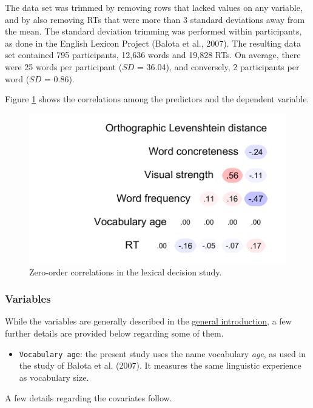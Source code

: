 \documentclass[
  12pt,
  man,floatsintext]{apa7}
\providecommand{\tightlist}{%
  \setlength{\itemsep}{0pt}\setlength{\parskip}{0pt}}
\begin{document}
The data set was trimmed by removing rows that lacked values on any variable, and by also removing RTs that were more than 3 standard deviations away from the mean. The standard deviation trimming was performed within participants, as done in the English Lexicon Project (Balota et al., 2007). The resulting data set contained 795 participants, 12,636 words and 19,828 RTs. On average, there were 25 words per participant (\(SD\) = 36.04), and conversely, 2 participants per word (\(SD\) = 0.86).

Figure \ref{fig:lexicaldecision-correlations} shows the correlations among the predictors and the dependent variable.

\begin{figure}

{\centering \includegraphics[width=0.52\linewidth]{manuscript_files/figure-latex/lexicaldecision-correlations-1} 

}

\caption{Zero-order correlations in the lexical decision study.}\label{fig:lexicaldecision-correlations}
\end{figure}

\hypertarget{variables-2}{%
\subsubsection{Variables}\label{variables-2}}

While the variables are generally described in the \protect\hyperlink{present-studies}{\underline{general introduction}}, a few further details are provided below regarding some of them.

\begin{itemize}
\tightlist
\item
  \texttt{Vocabulary\ age}: the present study uses the name vocabulary \emph{age}, as used in the study of Balota et al. (2007). It measures the same linguistic experience as vocabulary size.
\end{itemize}

A few details regarding the covariates follow.
\end{document}
